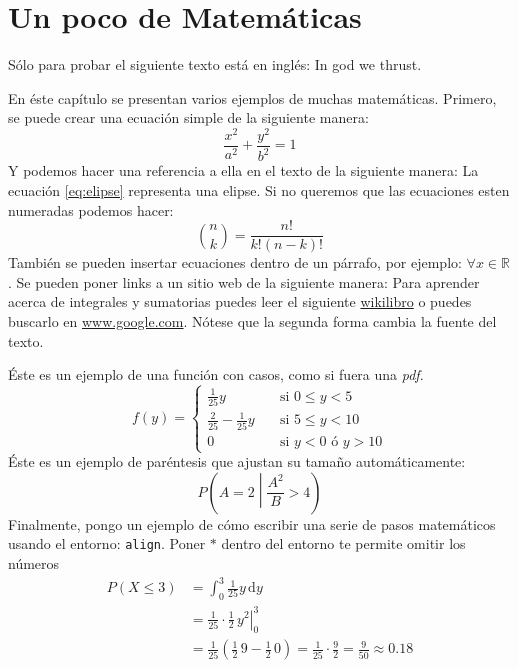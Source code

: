 \chapter{Un poco de Matemáticas}
\label{chap:mate}
Sólo para probar el siguiente texto está en inglés: \textenglish{In god we thrust}.

En éste capítulo se presentan varios ejemplos de muchas matemáticas.
Primero, se puede crear una ecuación simple de la siguiente manera:
\begin{equation}
 \label{eq:elipse}
 \frac{x^{2}}{a^{2}} + \frac{y^{2}}{b^{2}} = 1
\end{equation}
Y podemos hacer una referencia a ella en el texto de la siguiente manera: La  ecuación \eqref{eq:elipse} representa una elipse.
Si no queremos que las ecuaciones esten numeradas podemos hacer:
\begin{equation}
 \nonumber
 \binom{n}{k} = \frac{n!}{k!(n-k)!}
\end{equation}
También se pueden insertar ecuaciones dentro de un párrafo, por ejemplo: $\forall x \in \mathbb{R}$.
Se pueden poner links a un sitio web de la siguiente manera:
Para aprender acerca de integrales y sumatorias puedes leer el siguiente \href{https://en.wikibooks.org/wiki/LaTeX/Mathematics#Sums_and_integrals}{wikilibro} o puedes buscarlo en \url{www.google.com}.
Nótese que la segunda forma cambia la fuente del texto.
 
Éste es un ejemplo de una función con casos, como si fuera una \emph{pdf}.
\begin{equation}
 \label{eq:pdf}
 f(y) =
 \begin{cases}
   \frac{1}{25} y & \quad \text{si } 0 \leq y < 5 \\
   \frac{2}{25} - \frac{1}{25} y & \quad \text{si } 5 \leq y < 10 \\
   0 & \quad \text{si } y < 0 \text{ ó } y > 10
 \end{cases}
\end{equation}
Éste es un ejemplo de paréntesis que ajustan su tamaño automáticamente:
\begin{equation}
 \nonumber
 P\left(A=2\middle|\frac{A^2}{B}>4\right)
\end{equation}
Finalmente, pongo un ejemplo de cómo escribir una serie de pasos matemáticos usando el entorno: \verb|align|.
Poner $*$ dentro del entorno te permite omitir los números
\begin{align*}
P\left(X \leq 3 \right) &= \int_{0}^{3} \frac{1}{25} y \,\mathrm{d}y \\
     &= \left. \frac{1}{25} \cdot \frac{1}{2} \, y^{2} \right|_0^3 \\
     &= \frac{1}{25} \left( \frac{1}{2} \, 9 - \frac{1}{2} \, 0 \right) =
     \frac{1}{25} \cdot \frac{9}{2} = \frac{9}{50} \approx 0.18
\end{align*}

